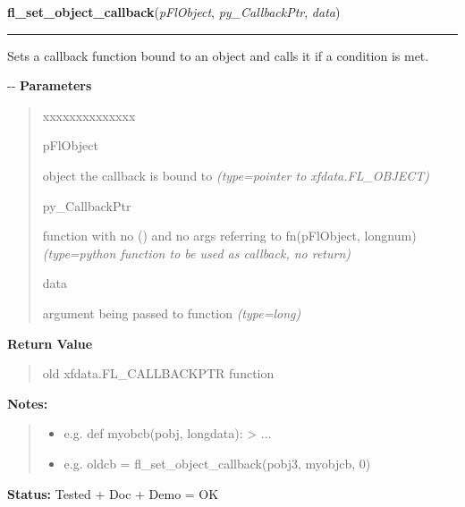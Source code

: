 \hspace{.8\funcindent}\begin{boxedminipage}{\funcwidth}

    \raggedright \textbf{fl\_set\_object\_callback}(\textit{pFlObject}, \textit{py\_CallbackPtr}, \textit{data})

    \vspace{-1.5ex}

    \rule{\textwidth}{0.5\fboxrule}
\setlength{\parskip}{2ex}

Sets a callback function bound to an object and calls it if a condition
is met.

-{}-
\setlength{\parskip}{1ex}
      \textbf{Parameters}
      \vspace{-1ex}

      \begin{quote}
        \begin{Ventry}{xxxxxxxxxxxxxx}

          \item[pFlObject]


object the callback is bound to
            {\it (type=pointer to xfdata.FL\_OBJECT)}

          \item[py\_CallbackPtr]


function with no () and no args referring to fn(pFlObject, longnum)
            {\it (type=python function to be used as callback, no return)}

          \item[data]


argument being passed to function
            {\it (type=long)}

        \end{Ventry}

      \end{quote}

      \textbf{Return Value}
    \vspace{-1ex}

      \begin{quote}

old xfdata.FL\_CALLBACKPTR function
      \end{quote}

\textbf{Notes:}
\begin{quote}
  \begin{itemize}

  \item
    \setlength{\parskip}{0.6ex}

e.g. def myobcb(pobj, longdata): > ...


  \item 
e.g. oldcb = fl\_set\_object\_callback(pobj3, myobjcb, 0)


\end{itemize}

\end{quote}

\textbf{Status:} 
Tested + Doc + Demo = OK


    \end{boxedminipage}

